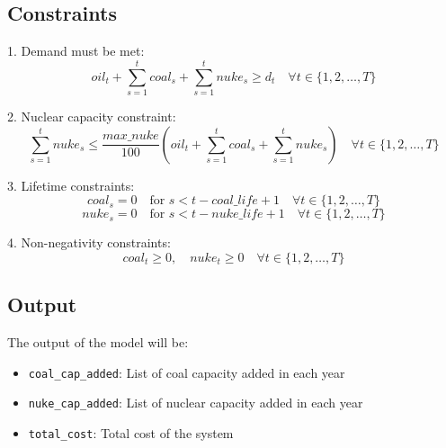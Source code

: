\documentclass{article}
\begin{document}
\subsection*{Constraints}
1. Demand must be met:
\[
oil_t + \sum_{s=1}^{t} coal_s + \sum_{s=1}^{t} nuke_s \geq d_t \quad \forall t \in \{1, 2, \ldots, T\}
\]

2. Nuclear capacity constraint:
\[
\sum_{s=1}^{t} nuke_s \leq \frac{max\_nuke}{100} \left( oil_t + \sum_{s=1}^{t} coal_s + \sum_{s=1}^{t} nuke_s \right) \quad \forall t \in \{1, 2, \ldots, T\}
\]

3. Lifetime constraints:
\[
coal_s = 0 \quad \text{for } s < t - coal\_life + 1 \quad \forall t \in \{1, 2, \ldots, T\}
\]
\[
nuke_s = 0 \quad \text{for } s < t - nuke\_life + 1 \quad \forall t \in \{1, 2, \ldots, T\}
\]

4. Non-negativity constraints:
\[
coal_t \geq 0, \quad nuke_t \geq 0 \quad \forall t \in \{1, 2, \ldots, T\}
\]

\subsection*{Output}
The output of the model will be:
\begin{itemize}
    \item \texttt{coal\_cap\_added}: List of coal capacity added in each year
    \item \texttt{nuke\_cap\_added}: List of nuclear capacity added in each year
    \item \texttt{total\_cost}: Total cost of the system
\end{itemize}
\end{document}
